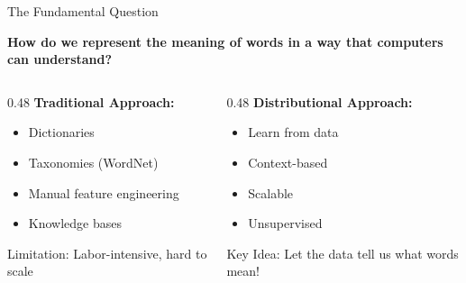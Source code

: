 \documentclass[aspectratio=169]{beamer}
\begin{document}
\begin{frame}[shrink=10]{The Fundamental Question 🤔}
\begin{center}
\LARGE
\textbf{How do we represent the meaning of words in a way that computers can understand?}
\end{center}

\pause
\vspace{1em}

\begin{columns}[T]
\begin{column}{0.48\textwidth}
\textbf{Traditional Approach:}
\begin{itemize}\setlength{\itemsep}{0pt}
    \item Dictionaries
    \item Taxonomies (WordNet)
    \item Manual feature engineering
    \item Knowledge bases
\end{itemize}

\vspace{0.5em}
\alert{Limitation:} Labor-intensive, hard to scale
\end{column}

\begin{column}{0.48\textwidth}
\textbf{Distributional Approach:}
\begin{itemize}\setlength{\itemsep}{0pt}
    \item Learn from data
    \item Context-based
    \item Scalable
    \item Unsupervised
\end{itemize}

\vspace{0.5em}
\alert{Key Idea:} Let the data tell us what words mean!
\end{column}
\end{columns}
\end{frame}
\end{document}
